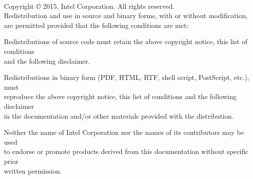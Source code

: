 
\vspace*{3.0cm}
 \\ 

\vspace*{0.5cm}

\noindent Copyright {\small\copyright} 2015, Intel Corporation. All rights reserved. \\

\noindent Redistribution and use in source and binary forms, with or without
modification, are permitted provided that the following conditions are met:

\begin{itemize*}
\item Redistributions of source code must retain the above copyright notice,
      this list of conditions \\ and the 
      following disclaimer.
\item Redistributions in binary form (PDF, HTML, RTF, shell script, PostScript,
      etc.), must \\ reproduce the above copyright notice, this list of conditions
      and the following disclaimer \\ in the documentation and/or other materials
      provided with the distribution.
\item Neither the name of Intel Corporation nor the names of its contributors
      may be used \\ to endorse or promote products derived from this
      documentation
      without specific prior \\ written permission.
\end{itemize*} 

\vspace*{0.5cm}

